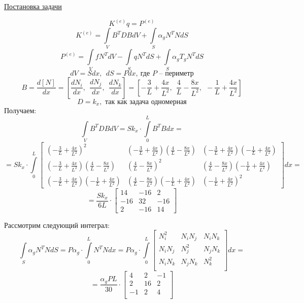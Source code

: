 \begin{center}
\underline{Постановка задачи}
\end{center}
\[K^{(e)} q = P^{(e)}\]
\[K^{(e)} = \int \limits_V B^T D B dV + \int \limits_S \alpha_g N^T N dS\]
\[P^{(e)} = \int \limits_V f N^T dV - \int \limits_S q N^T dS + \int \limits_S \alpha_g T_g N^T dS\]
\[dV = Sdx,\ \ dS = Pdx,\ \text{где } P \text{ -- периметр}\]
\[B = \frac{d[N]}{dx} = \left[ \frac{dN_i}{dx},\ \  \frac{dN_j}{dx},\ \  \frac{dN_k}{dx}\right] = \left[ -\frac{3}{L} + \frac{4x}{L^2},\ \  \frac{4}{L} - \frac{8x}{L^2},\ \  -\frac{1}{L} + \frac{4x}{L^2}\right]\]
\[D = k_x, \text{ так как задача одномерная}\]
Получаем:
\[\int \limits_V B^T D B dV = S k_x \cdot \int \limits_0^L  B^T B dx =\]
\[= Sk_x \cdot \int \limits_0^L
\begin{bmatrix}
\left(-\frac{3}{L} + \frac{4x}{L^2} \right)^2 & \left(-\frac{3}{L} + \frac{4x}{L^2} \right)\left(\frac{4}{L} - \frac{8x}{L^2} \right) & \left(-\frac{3}{L} + \frac{4x}{L^2} \right)\left(-\frac{1}{L} + \frac{4x}{L^2} \right) \\
\left(-\frac{3}{L} + \frac{4x}{L^2} \right)\left(\frac{4}{L} - \frac{8x}{L^2} \right) & \left(\frac{4}{L} - \frac{8x}{L^2} \right)^2 & \left(\frac{4}{L} - \frac{8x}{L^2} \right)\left(-\frac{1}{L} + \frac{4x}{L^2} \right)\\
\left(-\frac{3}{L} + \frac{4x}{L^2} \right)\left(-\frac{1}{L} + \frac{4x}{L^2} \right)& \left(\frac{4}{L} - \frac{8x}{L^2} \right)\left(-\frac{1}{L} + \frac{4x}{L^2} \right) & \left(-\frac{1}{L} + \frac{4x}{L^2} \right)^2
\end{bmatrix} dx =\]
\[= \frac{Sk_x}{6L} \cdot 
\begin{bmatrix}
14 & -16 & 2\\
-16 & 32 & -16\\
2 & -16 & 14
\end{bmatrix}\]

Рассмотрим следующий интеграл:
\[\int \limits_S \alpha_g N^T N dS = P \alpha_g \cdot \int \limits_0^L N^T N dx = P \alpha_g
\cdot \int \limits_0^L \begin{bmatrix}
N_i^2 & N_iN_j & N_iN_k \\
N_iN_j & N_j^2 & N_jN_k \\
N_iN_k & N_jN_k & N_k^2 \\
\end{bmatrix} dx = \]
\[= \frac{\alpha_g P L}{30} \cdot \begin{bmatrix}
4 & 2 & -1 \\
2 & 16 & 2 \\
-1 & 2 & 4 \\
\end{bmatrix}\]

